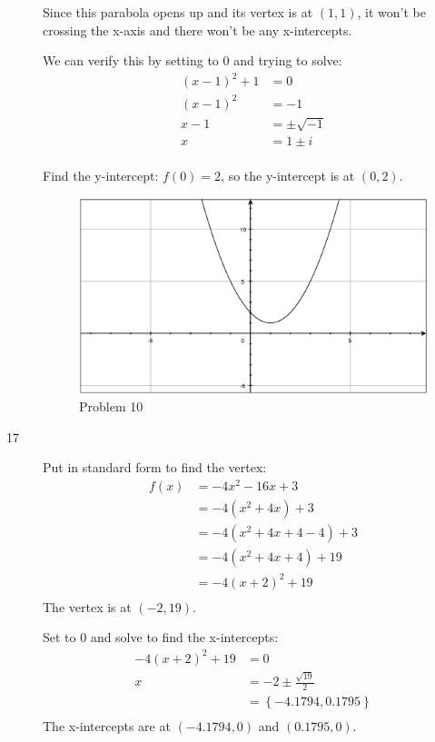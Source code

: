 \documentclass{exam}
\begin{document}
\begin{description}
      Since this parabola opens up and its vertex is at $(1, 1)$, it won't be crossing the x-axis and there won't be any
      x-intercepts.

      We can verify this by setting to 0 and trying to solve:
      \begin{align*}
          (x - 1)^2 + 1 &= 0 \\
          (x - 1)^2     &= -1 \\
          x - 1         &= \pm \sqrt{-1} \\
          x             &= 1 \pm i \\
      \end{align*}

      Find the y-intercept: $f(0) = 2$, so the y-intercept is at $(0, 2)$.

      \begin{figure}[H]
        \centering
        \includegraphics[scale=.3]{problem_10.eps}
        \caption*{Problem 10}
      \end{figure}

    \item[17]
      Put in standard form to find the vertex:
      \begin{align*}
        f(x) &= -4x^2 - 16x + 3 \\
             &= -4(x^2 + 4x) + 3 \\
             &= -4(x^2 + 4x + 4 - 4) + 3 \\
             &= -4(x^2 + 4x + 4) + 19 \\
             &= -4(x + 2)^2 + 19 \\
      \end{align*}
      The vertex is at $(-2, 19)$.

      Set to 0 and solve to find the x-intercepts:
      \begin{align*}
        -4(x + 2)^2 + 19 &= 0 \\
        x                &= -2 \pm \frac{\sqrt{19}}{2} \\
                         &= \left\{ -4.1794, 0.1795 \right\} \\
      \end{align*}
      The x-intercepts are at $(-4.1794, 0)$ and $(0.1795, 0)$.  


\end{description}
\end{document}
